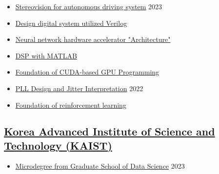 \documentclass[a4paper,9pt]{extarticle}
\begin{document}
\begin{itemize}
    \item \href{https://github.com/user-attachments/assets/2d45999d-1f66-467c-b956-e16b5ed71593}{Stereovision for autonomous driving system}                            \hfill 2023
    \item \href{https://github.com/user-attachments/assets/32bfc1d6-18cf-44a4-83dc-209b4f4686ac}{Design digital system utilized Verilog}
    \item \href{https://github.com/user-attachments/assets/094a58df-f320-45fb-aba3-707f4a7fd8f7}{Neural network hardware accelerator "Architecture"}
    \item \href{https://github.com/user-attachments/assets/9f74252d-eae5-40b2-b305-ea90576100aa}{DSP with MATLAB}
    \item \href{https://github.com/user-attachments/assets/0fc8c167-bef1-4857-a664-a1b82c95e306}{Foundation of CUDA-based GPU Programming}    
\end{itemize}
\begin{itemize}
    \item \href{https://github.com/user-attachments/assets/b4e013f1-d7b8-4505-a4f5-12e270097549}{PLL Design and Jitter Interpretation}                                  \hfill 2022
    \item \href{https://github.com/user-attachments/assets/73933790-2b15-46ae-8ac2-c6eaf31d9e01}{Foundation of reinforcement learning}                                  
\end{itemize}


\subsection*{\href{https://gsds.kaist.ac.kr}{Korea Advanced Institute of Science and Technology (KAIST)}}
\begin{itemize}
    \item \href{https://github.com/user-attachments/assets/b404e1df-2798-48de-8385-c9a6c7389b38}{Microdegree from Graduate School of Data Science}                    \hfill 2023
\end{itemize}
\end{document}
